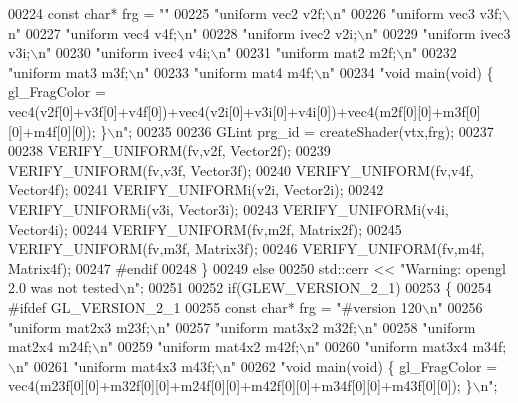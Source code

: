 \begin{DoxyCode}
00224       \textcolor{keyword}{const} \textcolor{keywordtype}{char}* frg = \textcolor{stringliteral}{""}
00225         \textcolor{stringliteral}{"uniform vec2 v2f;\(\backslash\)n"}
00226         \textcolor{stringliteral}{"uniform vec3 v3f;\(\backslash\)n"}
00227         \textcolor{stringliteral}{"uniform vec4 v4f;\(\backslash\)n"}
00228         \textcolor{stringliteral}{"uniform ivec2 v2i;\(\backslash\)n"}
00229         \textcolor{stringliteral}{"uniform ivec3 v3i;\(\backslash\)n"}
00230         \textcolor{stringliteral}{"uniform ivec4 v4i;\(\backslash\)n"}
00231         \textcolor{stringliteral}{"uniform mat2 m2f;\(\backslash\)n"}
00232         \textcolor{stringliteral}{"uniform mat3 m3f;\(\backslash\)n"}
00233         \textcolor{stringliteral}{"uniform mat4 m4f;\(\backslash\)n"}
00234         \textcolor{stringliteral}{"void main(void) \{ gl\_FragColor =
       vec4(v2f[0]+v3f[0]+v4f[0])+vec4(v2i[0]+v3i[0]+v4i[0])+vec4(m2f[0][0]+m3f[0][0]+m4f[0][0]); \}\(\backslash\)n"};
00235         
00236       GLint prg\_id = createShader(vtx,frg);
00237       
00238       VERIFY\_UNIFORM(fv,v2f, Vector2f);
00239       VERIFY\_UNIFORM(fv,v3f, Vector3f);
00240       VERIFY\_UNIFORM(fv,v4f, Vector4f);
00241       VERIFY\_UNIFORMi(v2i, Vector2i);
00242       VERIFY\_UNIFORMi(v3i, Vector3i);
00243       VERIFY\_UNIFORMi(v4i, Vector4i);
00244       VERIFY\_UNIFORM(fv,m2f, Matrix2f);
00245       VERIFY\_UNIFORM(fv,m3f, Matrix3f);
00246       VERIFY\_UNIFORM(fv,m4f, Matrix4f);
00247 \textcolor{preprocessor}{      #endif}
00248     \}
00249     \textcolor{keywordflow}{else}
00250       std::cerr << \textcolor{stringliteral}{"Warning: opengl 2.0 was not tested\(\backslash\)n"};
00251     
00252     \textcolor{keywordflow}{if}(GLEW\_VERSION\_2\_1)
00253     \{
00254 \textcolor{preprocessor}{      #ifdef GL\_VERSION\_2\_1}
00255       \textcolor{keyword}{const} \textcolor{keywordtype}{char}* frg = \textcolor{stringliteral}{"#version 120\(\backslash\)n"}
00256         \textcolor{stringliteral}{"uniform mat2x3 m23f;\(\backslash\)n"}
00257         \textcolor{stringliteral}{"uniform mat3x2 m32f;\(\backslash\)n"}
00258         \textcolor{stringliteral}{"uniform mat2x4 m24f;\(\backslash\)n"}
00259         \textcolor{stringliteral}{"uniform mat4x2 m42f;\(\backslash\)n"}
00260         \textcolor{stringliteral}{"uniform mat3x4 m34f;\(\backslash\)n"}
00261         \textcolor{stringliteral}{"uniform mat4x3 m43f;\(\backslash\)n"}
00262         \textcolor{stringliteral}{"void main(void) \{ gl\_FragColor =
       vec4(m23f[0][0]+m32f[0][0]+m24f[0][0]+m42f[0][0]+m34f[0][0]+m43f[0][0]); \}\(\backslash\)n"};

\end{DoxyCode}
